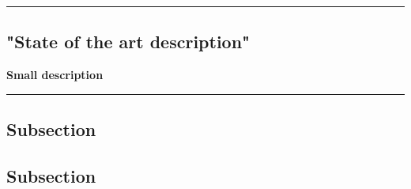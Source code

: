 {\color{gray}\hrule}
\begin{center}
\section{"State of the art description"}
\textbf{Small description}
\bigskip
\end{center}
{\color{gray}\hrule}
\begin{multicols}{2}
\subsection{Subsection}
\lipsum[1-3]
\subsection{Subsection}
\lipsum[1-2]
\end{multicols}


